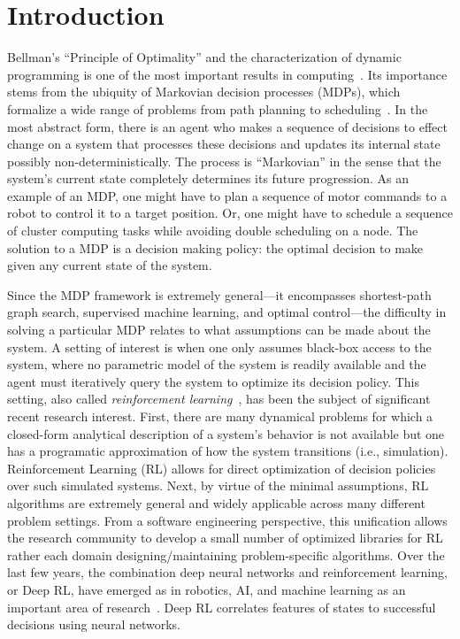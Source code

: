 \setcounter{secnumdepth}{0}
\chapter{Introduction}
Bellman's ``Principle of Optimality'' and the characterization of dynamic programming is one of the most important results in computing~\cite{bellman2013dynamic}. Its importance stems from the ubiquity of Markovian decision processes (MDPs), which formalize a wide range of problems from path planning to scheduling~\cite{howard1966dynamic}. In the most abstract form, there is an agent who makes a sequence of decisions to effect change on a system that processes these decisions and updates its internal state possibly non-deterministically. 
The process is ``Markovian'' in the sense that the system's current state completely determines its future progression. As an example of an MDP, one might have to plan a sequence of motor commands to a robot to control it to a target position. Or, one might have to schedule a sequence of cluster computing tasks while avoiding double scheduling on a node. 
The solution to a MDP is a decision making policy: the optimal decision to make given any current state of the system. 

Since the MDP framework is extremely general---it encompasses shortest-path graph search, supervised machine learning, and optimal control---the difficulty in solving a particular MDP relates to what assumptions can be made about the system.
A setting of interest is when one only assumes black-box access to the system, where no parametric model of the system is readily available and the agent must iteratively query the system to optimize its decision policy.
This setting, also called \emph{reinforcement learning}~\cite{sutton1998reinforcement}, has been the subject of significant recent research interest.
First, there are many dynamical problems for which a closed-form analytical description of a system's behavior is not available but one has a programatic approximation of how the system transitions (i.e., simulation).
Reinforcement Learning (RL) allows for direct optimization of decision policies over such simulated systems.
Next, by virtue of the minimal assumptions, RL algorithms are extremely general and widely applicable across many different problem settings.
From a software engineering perspective, this unification allows the research community to develop a small number of optimized libraries for RL rather each domain designing/maintaining problem-specific algorithms.
Over the last few years, the combination deep neural networks and reinforcement learning, or Deep RL, have emerged as in robotics, AI, and machine learning as an important area of research~\cite{mnih2015human,silver2017mastering, sunderhauf2018limits, stoica2017berkeley}.
Deep RL correlates features of states to successful decisions using neural networks. 

